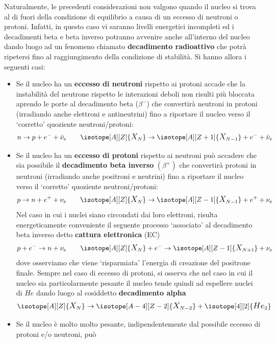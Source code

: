 Naturalmente, le precedenti considerazioni non valgono quando il nucleo si trova al di fuori della condizione di
equilibrio a causa di un eccesso di neutroni o protoni.
Infatti, in questo caso vi saranno livelli energetici incompleti ed i decadimenti beta e beta inverso potranno avvenire
anche all’interno del nucleo dando luogo ad un fenomeno chiamato \textbf{decadimento radioattivo} che potrà ripetersi fino al
raggiungimento della condizione di stabilità.
Si hanno allora i seguenti casi:

\begin{itemize}
    \item Se il nucleo ha un \textbf{eccesso di neutroni} rispetto ai protoni accade che la instabilità del neutrone rispetto le
    interazioni deboli non risulti più bloccata aprendo le porte al decadimento beta ($ \beta^{-} $) che convertirà
    neutroni in protoni (irradiando anche elettroni e antineutrini) fino a riportare il nucleo verso il `corretto’
    quoziente neutroni/protoni:
    \[
        n \to p + {e}^{-} + \bar{\nu}_e \qquad
        \isotope[A][Z]{\mathlarger{X}_{N}} \to \isotope[A][Z+1]{\mathlarger{X}_{N-1}} + {e}^{-} + \bar{\nu}_e
    \]
    \item Se il nucleo ha un \textbf{eccesso di protoni} rispetto ai neutroni può accadere che sia possibile il
    \textbf{decadimento beta inverso} $ (\beta^{+}) $ che convertirà protoni in neutroni (irradiando anche positroni e
    neutrini) fino a riportare il nucleo verso il `corretto' quoziente neutroni/protoni:
    \[
        p \to n + {e}^{+} + \nu_e \qquad
        \isotope[A][Z]{\mathlarger{X}_{N}} \to \isotope[A][Z-1]{\mathlarger{X}_{N-1}} + {e}^{+} + \nu_e
    \]
    Nel caso in cui i nuclei siano circondati dai loro elettroni, risulta energeticamente conveniente il seguente 
    processo ‘associato’ al decadimento beta inverso detto \textbf{cattura elettronica} (EC)
    \[
       p + {e}^{-} \to n + \nu_e \qquad
        \isotope[A][Z]{\mathlarger{X}_{N}} + {e}^{-} \to \isotope[A][Z-1]{\mathlarger{X}_{N+1}} + \nu_e
    \]
    dove osserviamo che viene ‘risparmiata’ l’energia di creazione del positrone finale.
    Sempre nel caso di eccesso di protoni, si osserva che nel caso in cui il nucleo sia particolarmente pesante il nucleo
    tende quindi ad espellere nuclei di $He$ dando luogo al cosiddetto \textbf{decadimento alpha}
    \[
       \isotope[A][Z]{\mathlarger{X}_{N}} \to \isotope[A -4][Z-2]{\mathlarger{X}_{N-2}} +
       \isotope[4][2]{\mathlarger{He}_{2}}
    \]
    \item Se il nucleo è molto molto pesante, indipendentemente dal possibile eccesso di protoni e/o neutroni, può

\end{itemize}

